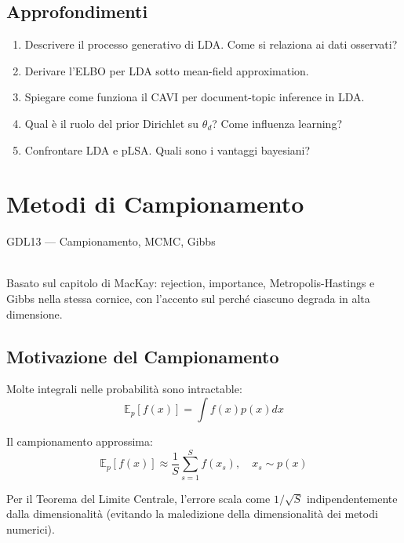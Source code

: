 \section{Approfondimenti}

\begin{tcolorbox}[title=Domande d'Esame]
  \begin{enumerate}
    \item Descrivere il processo generativo di LDA. Come si relaziona ai dati osservati?
    \item Derivare l'ELBO per LDA sotto mean-field approximation.
    \item Spiegare come funziona il CAVI per document-topic inference in LDA.
    \item Qual è il ruolo del prior Dirichlet su $\theta_d$? Come influenza learning?
    \item Confrontare LDA e pLSA. Quali sono i vantaggi bayesiani?
  \end{enumerate}
\end{tcolorbox}

\chapter{Metodi di Campionamento}

\begin{risorsevideo}{GDL13 — Campionamento, MCMC, Gibbs}

\medskip
{}\\
Basato sul capitolo di MacKay: rejection, importance, Metropolis-Hastings e Gibbs nella stessa cornice, con l'accento sul perché ciascuno degrada in alta dimensione.
\end{risorsevideo}

\section{Motivazione del Campionamento}

Molte integrali nelle probabilità sono intractable:
\[\mathbb{E}_p[f(x)] = \int f(x) p(x) dx\]

Il campionamento approssima:
\[\mathbb{E}_p[f(x)] \approx \frac{1}{S} \sum_{s=1}^S f(x_s), \quad x_s \sim p(x)\]

Per il Teorema del Limite Centrale, l'errore scala come $1/\sqrt{S}$ indipendentemente dalla dimensionalità (evitando la maledizione della dimensionalità dei metodi numerici).

